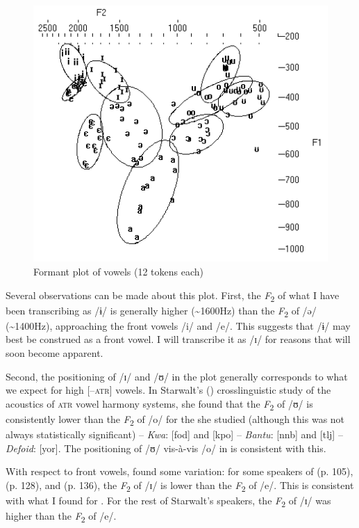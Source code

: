 \documentclass[output=paper,colorlinks,citecolor=brown]{langscibook}
\begin{document}
\begin{figure}
    \includegraphics[height=.3\textheight]{figures/OlsonFig1.png}
    \caption{Formant plot of  vowels (12 tokens each)}
    \label{fig:olson:1}
\end{figure}

Several observations can be made about this plot. First, the \textit{F}\textsubscript{2} of what I have been transcribing as /ɨ/ is generally higher (\~{}1600Hz) than the \textit{F}\textsubscript{2} of /ə/ (\~{}1400Hz), approaching the front vowels /i/ and /e/. This suggests that /ɨ/ may best be construed as a front vowel. I will transcribe it as /ɪ/ for reasons that will soon become apparent.

Second, the positioning of /ɪ/ and /ʊ/ in the plot generally corresponds to what we expect for high [–\textsc{atr}] vowels. In Starwalt's (\citeyear{Starwalt2008}) crosslinguistic study of the acoustics of \textsc{atr} vowel harmony  systems, she found that the \textit{F}\textsubscript{2} of /ʊ/ is consistently lower than the \textit{F}\textsubscript{2} of /o/ for the  she studied (although this was not always statistically significant) -- \textit{Kwa}:  [fod] and  [kpo] -- \textit{Bantu}:  [nnb] and  [tlj] -- \textit{Defoid}:  [yor]. The positioning of /ʊ/ vis-à-vis /o/ in  is consistent with this.

With respect to front vowels, \citeauthor{Starwalt2008} found some variation: for some speakers of  (p. 105),  (p. 128), and  (p. 136), the \textit{F}\textsubscript{2} of /ɪ/ is lower than the \textit{F}\textsubscript{2} of /e/. This is consistent with what I found for . For the rest of Starwalt’s speakers, the \textit{F}\textsubscript{2} of /ɪ/ was higher than the \textit{F}\textsubscript{2} of /e/.
\end{document}
